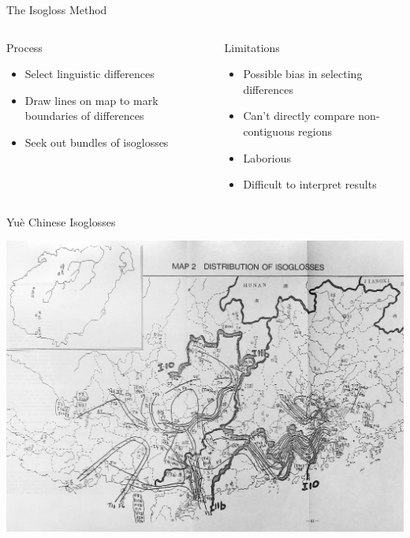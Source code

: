 \documentclass[presentation]{beamer}
\begin{document}
\begin{frame}[label={sec:org86fb115}]{The Isogloss Method}
\begin{columns}
\begin{column}{0.5\columnwidth}
\begin{block}{Process}
\begin{itemize}
\item Select linguistic differences
\item Draw lines on map to mark boundaries of differences
\item Seek out bundles of isoglosses
\end{itemize}
\end{block}
\end{column}
\begin{column}{0.5\columnwidth}
\begin{block}{Limitations}
\begin{itemize}
\item Possible bias in selecting differences
\item Can't directly compare non-contiguous regions
\item Laborious
\item Difficult to interpret results
\end{itemize}
\end{block}
\end{column}
\end{columns}
\end{frame}
\begin{frame}[label={sec:org36b434c}]{Yuè Chinese Isoglosses}
\textcite[p. 41]{yue-hashimoto1988preliminaryinvestigation}
\begin{center}
\includegraphics[width=.9\linewidth]{Screen Shot 2022-05-21 at 3.40.46 PM.png}
\end{center}
\end{frame}
\end{document}
